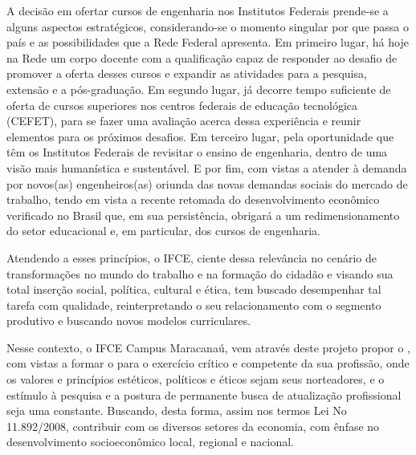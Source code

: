 A decisão em ofertar cursos de engenharia nos Institutos Federais prende-se a alguns aspectos estratégicos, considerando-se o momento singular por que passa o país e as possibilidades que a Rede Federal apresenta. Em primeiro lugar, há hoje na Rede um corpo docente com a qualificação capaz de responder ao desafio de promover a oferta desses cursos e expandir as atividades para a pesquisa, extensão e a pós-graduação. Em segundo lugar, já decorre tempo suficiente de oferta de cursos superiores nos centros federais de educação tecnológica (CEFET), para se fazer uma avaliação acerca dessa experiência e reunir elementos para os próximos desafios. Em terceiro lugar, pela oportunidade que têm os Institutos Federais de revisitar o ensino de engenharia, dentro de uma visão mais humanística e sustentável. E por fim, com vistas a atender à demanda por novos(as) engenheiros(as) oriunda das novas demandas sociais do mercado de trabalho, tendo em vista a recente retomada do desenvolvimento econômico verificado no Brasil que, em sua persistência, obrigará a um redimensionamento do setor educacional e, em particular, dos cursos de engenharia.

Atendendo a esses princípios, o IFCE, ciente dessa relevância no cenário de transformações no mundo do trabalho e na formação do cidadão e visando sua total inserção social, política, cultural e ética, tem buscado desempenhar tal tarefa com qualidade, reinterpretando o seu relacionamento com o segmento produtivo e buscando novos modelos curriculares.

Nesse contexto, o IFCE Campus Maracanaú, vem através deste projeto propor o \NOMECURSO, com vistas a formar o \NOMEPROFISSIONAL para o exercício crítico e competente da sua profissão, onde os valores e princípios estéticos, políticos e éticos sejam seus norteadores, e o estímulo à pesquisa e a postura de permanente busca de atualização profissional seja uma constante. Buscando, desta forma, assim nos termos Lei No 11.892/2008, contribuir com os diversos setores da economia, com ênfase no desenvolvimento socioeconômico local, regional e nacional.

